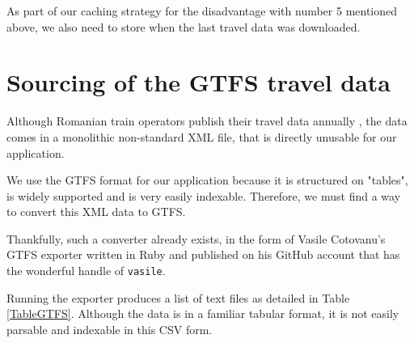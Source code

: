 As part of our caching strategy for the disadvantage with number 5 mentioned above, we also need to store when the last travel data was downloaded.

\section{Sourcing of the GTFS travel data}

Although Romanian train operators publish their travel data annually \cite{DataGovRoDespre} \cite{DataGovRoLicense}, the data comes in a monolithic non-standard XML file, that is directly unusable for our application.

We use the GTFS format for our application because it is structured on "tables", is widely supported and is very easily indexable. Therefore, we must find a way to convert this XML data to GTFS.

Thankfully, such a converter already exists, in the form of Vasile Cotovanu's GTFS exporter \cite{VasileRubyExporter} written in Ruby and published on his GitHub account that has the wonderful handle of \verb|vasile|.

Running the exporter produces a list of text files as detailed in Table \ref{TableGTFS}. Although the data is in a familiar tabular format, it is not easily parsable and indexable in this CSV form.
